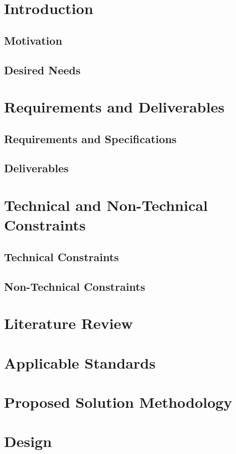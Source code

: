 \documentclass[12pt]{article}
\begin{document}
\renewcommand{\contentsname}{Table of Contents}
\tableofcontents
\newpage
\listoffigures
\listoftables
\newpage
\section{Introduction}
\subsection{Motivation}
\subsection{Desired Needs}
\section{Requirements and Deliverables}
\subsection{Requirements and Specifications}
\subsection{Deliverables}
\section{Technical and Non-Technical Constraints}
\subsection{Technical Constraints}
\subsection{Non-Technical Constraints}
\section{Literature Review}
\section{Applicable Standards}
\section{Proposed Solution Methodology}
\section{Design}
\newpage
\end{document}
